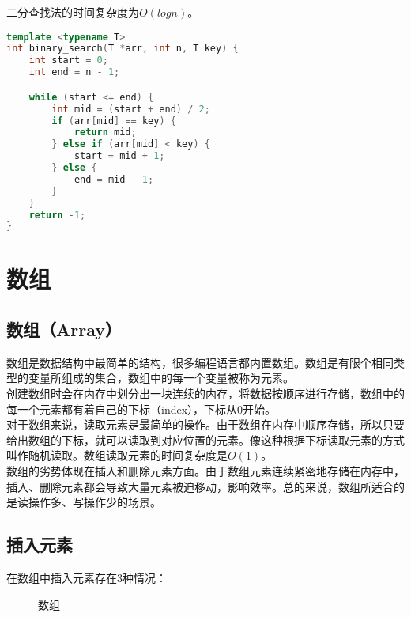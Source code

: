 二分查找法的时间复杂度为$ O(logn) $。\\


\begin{lstlisting}[language=C++]
template <typename T>
int binary_search(T *arr, int n, T key) {
    int start = 0;
    int end = n - 1;

    while (start <= end) {
        int mid = (start + end) / 2;
        if (arr[mid] == key) {
            return mid;
        } else if (arr[mid] < key) {
            start = mid + 1;
        } else {
            end = mid - 1;
        }
    }
    return -1;
}
\end{lstlisting}

\newpage

\section{数组}

\subsection{数组（Array）}

数组是数据结构中最简单的结构，很多编程语言都内置数组。数组是有限个相同类型的变量所组成的集合，数组中的每一个变量被称为元素。\\

创建数组时会在内存中划分出一块连续的内存，将数据按顺序进行存储，数组中的每一个元素都有着自己的下标（index），下标从0开始。\\

对于数组来说，读取元素是最简单的操作。由于数组在内存中顺序存储，所以只要给出数组的下标，就可以读取到对应位置的元素。像这种根据下标读取元素的方式叫作随机读取。数组读取元素的时间复杂度是$ O(1) $。\\

数组的劣势体现在插入和删除元素方面。由于数组元素连续紧密地存储在内存中，插入、删除元素都会导致大量元素被迫移动，影响效率。总的来说，数组所适合的是读操作多、写操作少的场景。\\

\subsection{插入元素}

在数组中插入元素存在3种情况：

\begin{figure}[H]
    \centering
    \caption{数组}
\end{figure}

